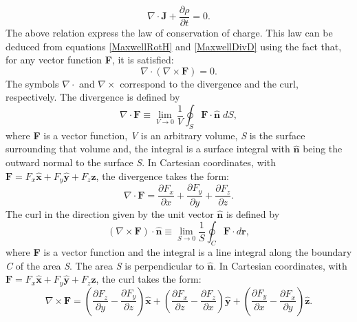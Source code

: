 \begin{equation}\label{ContinuityEquation}
	\nabla\cdot\mathbf{J} + \frac{\partial\rho}{\partial{t}} = 0.
\end{equation}
The above relation express the law of conservation of charge. This law can be deduced from equations \eqref{MaxwellRotH} and \eqref{MaxwellDivD} using the fact that, for any vector function \textbf{F}, it is satisfied:
\begin{equation}\label{DivCurleq0}
	\nabla\cdot(\nabla\times\textbf{F}) = 0.
\end{equation}
The symbols $\nabla\cdot$ and $\nabla\times$ correspond to the divergence and the curl, respectively. The divergence is defined by
\begin{equation}\label{DefDiv}
	\nabla\cdot\mathbf{F} \equiv \lim_{V \rightarrow 0} \frac{1}{V}
	\oint_{S} \mathbf{F}\cdot\mathbf{\hat{n}} \; dS,
\end{equation}
where \textbf{F} is a vector function, \textit{V} is an arbitrary volume, \textit{S} is the surface surrounding that volume and, the integral is a surface integral with $\mathbf{\hat{n}}$ being the outward normal to the
surface \textit{S}. In Cartesian coordinates, with $\mathbf{F} = F_{x}\mathbf{\hat{x}} + F_{y}\mathbf{\hat{y}} + F_{z}\mathbf{\hat{z}}$, the divergence takes the form:
\begin{equation}\label{CartesianDiv}
	\nabla\cdot\mathbf{F} = \frac{\partial F_{x}}{\partial x} + \frac{\partial F_{y}}{\partial y} + \frac{\partial F_{z}}{\partial z}.
\end{equation}
The curl in the direction given by the unit vector $\mathbf{\hat{n}}$ is defined by
\begin{equation}\label{DefRot}
	(\nabla\times\mathbf{F})\cdot\mathbf{\hat{n}}  \equiv \lim_{S \rightarrow 0} \frac{1}{S} \oint_{C} \mathbf{F}\cdot d\mathbf{r},
\end{equation}
where \textbf{F} is a vector function and the integral is a line integral along the boundary \textit{C} of the area \textit{S}. The area \textit{S} is perpendicular to $\mathbf{\hat{n}}$. In Cartesian coordinates, with $\mathbf{F} = F_{x}\mathbf{\hat{x}} + F_{y}\mathbf{\hat{y}} + F_{z}\mathbf{\hat{z}}$, the curl takes the form:
\begin{equation}\label{CartesianRot}
	\nabla\times\mathbf{F} =    \left(\frac{\partial F_z}{\partial y} - \frac{\partial F_y}{\partial z}\right)\mathbf{\hat{x}} + \left(\frac{\partial F_x}{\partial z} - \frac{\partial F_z}{\partial x}\right)\mathbf{\hat{y}} + \left(\frac{\partial F_y}{\partial x} - \frac{\partial F_x}{\partial y}\right)\mathbf{\hat{z}}.
\end{equation}
